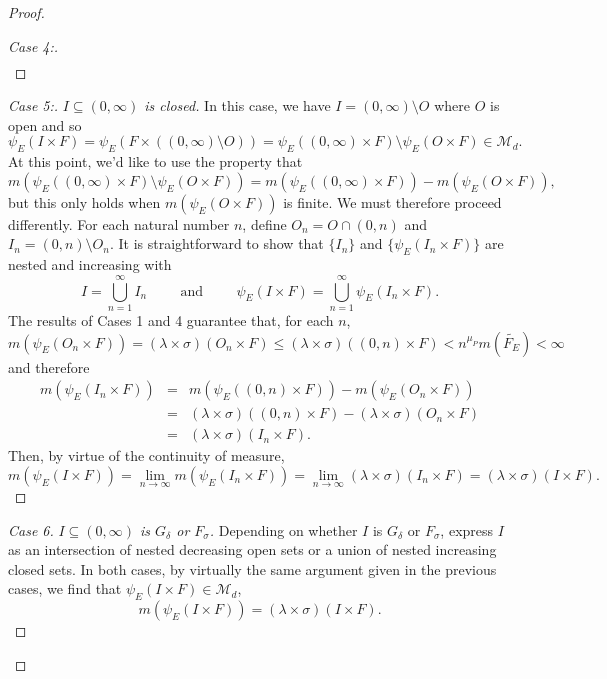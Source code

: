 \documentclass[11pt, letter]{book}
\newcommand*{\myproofname}{Proof}
\newenvironment{subproof}[1][\myproofname]{\begin{proof}[#1]\renewcommand*{\qedsymbol}{$\mathbin{/\mkern-6mu/}$}}{\end{proof}}
\begin{document}
\begin{proof}
\begin{subproof}[Case 4:]
\begin{eqnarray*}
\end{eqnarray*}
\end{subproof}
\begin{subproof}[Case 5:]\textit{$I\subseteq (0,\infty)$ is closed.} In this case, we have $I=(0,\infty)\setminus O$ where $O$ is open and so
\begin{equation*}
\psi_E(I\times F)=\psi_E(F\times ((0,\infty)\setminus O))=\psi_E( (0,\infty)\times F)\setminus \psi_E(O\times F)\in\mathcal{M}_d.
\end{equation*}
At this point, we'd like to use the property that 
\begin{equation*}
m(\psi_E((0,\infty)\times F)\setminus \psi_E( O\times F))=m(\psi_E((0,\infty)\times F))-m(\psi_E(O\times F)),
\end{equation*} but this only holds when $m(\psi_E(O\times F))$ is finite. We must therefore proceed differently. For each natural number $n$, define $O_n=O\cap(0,n)$ and $I_n=(0,n)\setminus O_n$. It is straightforward to show that $\{I_n\}$ and $\{\psi_E(I_n\times F)\}$ are nested and increasing with
\begin{equation*}
I=\bigcup_{n=1}^\infty I_n\hspace{1cm}\mbox{and}\hspace{1cm}\psi_E(I\times F)=\bigcup_{n=1}^\infty \psi_E(I_n\times F). 
\end{equation*}
The results of Cases 1 and 4 guarantee that, for each $n$,
\begin{equation*}
m(\psi_E(O_n\times F))=(\lambda\times\sigma)(O_n\times F)\leq (\lambda\times\sigma)((0,n)\times F)<n^{\mu_P}m(\widetilde{F_E})<\infty
\end{equation*}
and therefore
\begin{eqnarray*}
m(\psi_E(I_n\times F))
&=&m(\psi_E((0,n)\times F))-m(\psi_E(O_n\times F))\\
&=&(\lambda\times\sigma)((0,n)\times F)-(\lambda\times\sigma)(O_n\times F)\\
&=&(\lambda\times\sigma)(I_n\times F).
\end{eqnarray*}
Then, by virtue of the continuity of measure,
\begin{equation*}
m(\psi_E(I\times F))=\lim_{n\to\infty}m(\psi_E(I_n\times F))=\lim_{n\to\infty}(\lambda\times\sigma)(I_n\times F)=(\lambda\times\sigma)(I\times F). 
\end{equation*}
\end{subproof}
\begin{subproof}[Case 6]\textit{$I\subseteq (0,\infty)$ is $G_\delta$ or $F_\sigma$.} Depending on whether $I$ is $G_\delta$ or $F_\sigma$,  express $I$ as an intersection of nested decreasing open sets or a union of nested increasing closed sets. In both cases, by virtually the same argument given in the previous cases, we find that $\psi_E(I\times F)\in \mathcal{M}_d$,
\begin{equation*}
m(\psi_E(I\times F))=(\lambda\times\sigma)(I\times F).
\end{equation*}
\end{subproof}
\end{proof}
\end{document}
